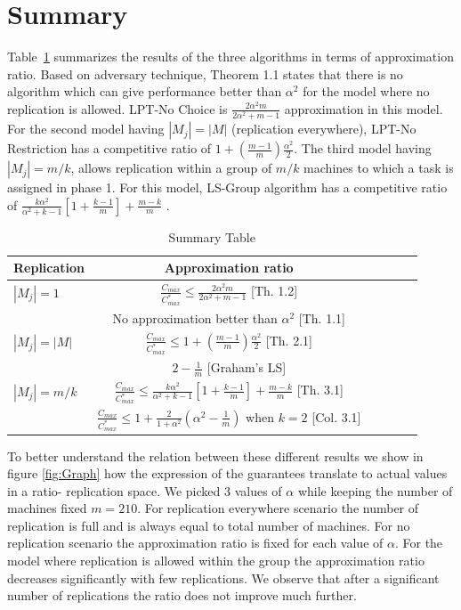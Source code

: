 \documentclass[10pt, conference, compsocconf]{IEEEtran}
\begin{document}
\section{Summary}\label{sec7}
 Table~\ref{tab:template} summarizes the results of the three algorithms in terms of approximation ratio. Based on
adversary technique, Theorem 1.1 states that there is no algorithm which can give performance better than $\alpha^2$ for the model where no replication is allowed.  LPT-No Choice is $\frac{2\alpha^{2}m}{2\alpha^{2}+ m-1}$ approximation  in this model. For the second model having $|M_j| = |M|$ (replication everywhere), LPT-No Restriction has a competitive ratio of $1 + (\frac{m-1}{m})\frac{\alpha^{2}}{2}$.  The third model having $|M_j| = m/k$, allows replication within a group of $m/k$ machines to which a task is assigned in phase 1. For this model, LS-Group algorithm has a competitive ratio of $\frac{k\alpha^{2}}{\alpha^{2}+k-1}\left[1+ {\frac{k-1}{m}} \right]+ {\frac{m-k}{m}}$ .



\begin{table}[ht]
\centering
\begin{tabular}{|l|c|c|c|c|c|}
\hline
Replication & Approximation ratio  \\
\hline
$|M_j|=1$ & $\frac{C_{max}}{C_{max}^{*}}\leq \frac{2\alpha^{2}m}{2\alpha^{2}+ m-1}$ [Th. 1.2]  \\
 & No approximation better than $\alpha^2$ [Th. 1.1]   \\

\hline
$|M_j|=|M|$ & $\frac{C_{max}}{C_{max}^{*}} \leq 1 + (\frac{m-1}{m})\frac{\alpha^{2}}{2}$ [Th. 2.1]  \\
 & $2-\frac{1}{m}$ [Graham's LS]   \\
 \hline
 
 $|M_j|= m/k $ & $\frac{C_{max}}{C_{max}^{*}} \leq \frac{k\alpha^{2}}{\alpha^{2}+k-1}\left[1+ {\frac{k-1}{m}} \right]+ {\frac{m-k}{m}}$ [Th. 3.1]  \\
  & $\frac{C_{max}}{C_{max}^{*}} \leq  1+ \frac{2}{1+\alpha^{2}} \left(\alpha^2-\frac{1}{m}\right)$ when $k=2$ [Col. 3.1]   \\
  
  \hline
 \end{tabular}
\caption{Summary Table}
\label{tab:template}
\end{table}


To better understand the relation between these different results we show in figure \ref{fig:Graph} how the expression of the guarantees translate to actual values in a ratio- replication space.  We picked 3 values of $\alpha$ while keeping the number of machines fixed $m=210$. For replication everywhere scenario the number of replication is full and is always equal to total number of machines.  For no replication scenario the approximation ratio is fixed for each value of $\alpha$.  For the model where replication is allowed within the group the approximation ratio decreases significantly with few replications. We observe that after a significant number of replications the ratio does not improve much further. 
\end{document}
